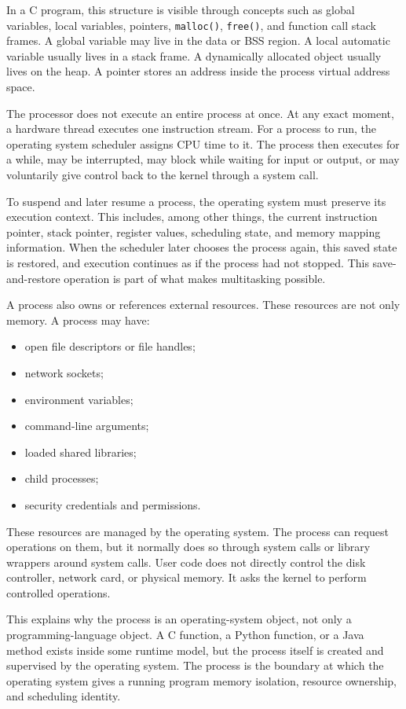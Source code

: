 \documentclass[a4paper,twoside]{report}
\begin{document}
In a C program, this structure is visible through concepts such as global variables, local variables, pointers, \texttt{malloc()}, \texttt{free()}, and function call stack frames. A global variable may live in the data or BSS region. A local automatic variable usually lives in a stack frame. A dynamically allocated object usually lives on the heap. A pointer stores an address inside the process virtual address space.

The processor does not execute an entire process at once. At any exact moment, a hardware thread executes one instruction stream. For a process to run, the operating system scheduler assigns CPU time to it. The process then executes for a while, may be interrupted, may block while waiting for input or output, or may voluntarily give control back to the kernel through a system call.

To suspend and later resume a process, the operating system must preserve its execution context. This includes, among other things, the current instruction pointer, stack pointer, register values, scheduling state, and memory mapping information. When the scheduler later chooses the process again, this saved state is restored, and execution continues as if the process had not stopped. This save-and-restore operation is part of what makes multitasking possible.

A process also owns or references external resources. These resources are not only memory. A process may have:

\begin{itemize}
    \item open file descriptors or file handles;
    \item network sockets;
    \item environment variables;
    \item command-line arguments;
    \item loaded shared libraries;
    \item child processes;
    \item security credentials and permissions.
\end{itemize}

These resources are managed by the operating system. The process can request operations on them, but it normally does so through system calls or library wrappers around system calls. User code does not directly control the disk controller, network card, or physical memory. It asks the kernel to perform controlled operations.

This explains why the process is an operating-system object, not only a programming-language object. A C function, a Python function, or a Java method exists inside some runtime model, but the process itself is created and supervised by the operating system. The process is the boundary at which the operating system gives a running program memory isolation, resource ownership, and scheduling identity.
\end{document}
